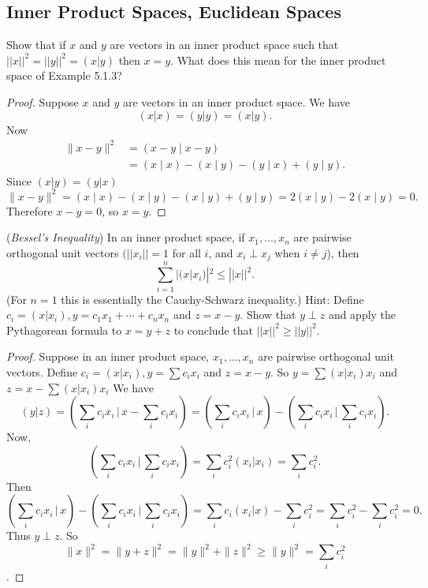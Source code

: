 \subsection{Inner Product Spaces, Euclidean Spaces}

\begin{tcolorbox}[title=Problem 1, breakable]
    Show that if $x$ and $y$ are vectors in an inner product
        space such that $||x||^2 = ||y||^2 = (x|y)$ then $x = y$.
    What does this mean for the inner product space of Example 5.1.3?
\end{tcolorbox}

\begin{proof}
    Suppose $x$ and $y$ are vectors in an inner product space.
    We have 
    \[(x|x) = (y|y) = (x|y).\]
    Now
    \begin{align*}
        \|x - y\|^2 &= (x - y \mid x - y) \\
        &= (x \mid x) - (x \mid y) - (y \mid x) + (y \mid y).
    \end{align*}
    Since $(x|y) = (y|x)$
    \[\|x - y\|^2 = (x \mid x) - (x \mid y) - (x \mid y) + (y \mid y) = 2(x \mid y) - 2(x \mid y) = 0.\]
    Therefore $x - y = 0$, so $x = y$.
\end{proof}


\begin{tcolorbox}[title=Problem 2, breakable]
    (\emph{Bessel's Inequality}) In an inner product space, if $x_1, \ldots, x_n$
    are pairwise orthogonal unit vectors $(||x_i|| = 1$ for all $i$,
    and $x_i \perp x_j$ when $i \ne j$), then 
    \[\sum_{i = 1}^{n} |(x | x_i)|^2 \le ||x||^2.\]
    (For $n = 1$ this is essentially the Cauchy-Schwarz inequality.)
    {Hint: Define $c_i = (x|x_i), y = c_1 x_1 + \cdots + c_n x_n$ and 
    $z = x - y$. Show that $y \perp z$ and apply the Pythagorean formula to 
    $x = y + z$ to conclude that $||x||^2 \ge ||y||^2$.}
\end{tcolorbox}

\begin{proof}
    Suppose in an inner product space, $x_1, \ldots, x_n$ are pairwise orthogonal unit vectors.
    Define $c_i = (x|x_i), y = \sum c_i x_i$ and 
        $z = x - y$.
    So $y = \sum (x|x_i) x_i$ and $z = x - \sum (x|x_i) x_i$
    We have 
    \[(y|z) = \left(\sum_i c_i x_i \,\Big|\, x - \sum_i c_i x_i\right) = \left(\sum_i c_i x_i \,\Big|\, x\right) - \left(\sum_i c_i x_i \,\Big|\, \sum_i c_i x_i\right).\]
    Now,
    \[\left(\sum_i c_i x_i \,\Big|\, \sum_i c_i x_i\right) = \sum_i c_i^2 \left(x_i|x_i\right) = \sum_i c_i^2.\]
    Then 
    \[\left(\sum_i c_i x_i \,\Big|\, x\right) - \left(\sum_i c_i x_i \,\Big|\, \sum_i c_i x_i\right) = \sum_i c_i (x_i | x) - \sum_i c_i^2 = \sum_i c_i^2 - \sum_i c_i^2 = 0.\]
    Thus $y \perp z$. So 
    \[\|x\|^2 = \|y + z\|^2 = \|y\|^2 + \|z\|^2 \geq \|y\|^2 = \sum_i c_i^2\].
\end{proof}

